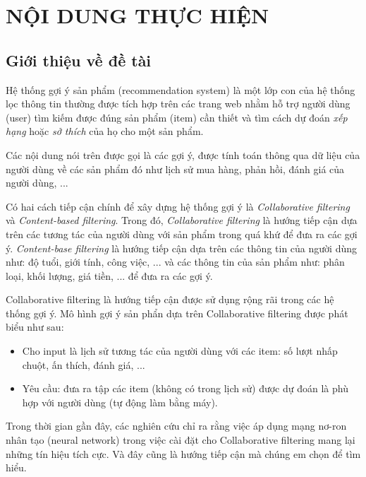 \documentclass{article}[14pt]
\begin{document}
    \section{NỘI DUNG THỰC HIỆN}
    {

    
    \subsection{Giới thiệu về đề tài}
    
    
        Hệ thống gợi ý sản phẩm (recommendation system) là một lớp con của hệ thống
    lọc thông tin thường được tích hợp trên các trang web nhằm hỗ trợ 
    người dùng (user) tìm kiếm được đúng sản phẩm (item) cần thiết  
    và tìm cách dự đoán \textit{xếp hạng} hoặc \textit{sở thích} 
    của họ cho một sản phẩm.
    
    Các nội dung nói trên được gọi là các gợi ý, được tính toán thông qua dữ liệu
    của người dùng về các sản phẩm đó như lịch sử mua hàng, phản hồi, đánh giá của
    người dùng, ...

    Có hai cách tiếp cận chính để xây dựng hệ thống gợi ý là 
    \textit{Collaborative filtering} và \textit{Content-based filtering}.
    Trong đó, \textit{Collaborative filtering} là hướng tiếp cận dựa trên các 
    tương tác của người dùng với sản phẩm trong quá khứ để đưa ra các gợi ý. 
    \textit{Content-base filtering} là hướng tiếp cận dựa trên các thông tin 
    của người dùng như: độ tuổi, giới tính, công việc, ... và các thông tin 
    của sản phẩm như: phân loại, khối lượng, giá tiền, ... để đưa ra các gợi ý.

    Collaborative filtering là hướng tiếp cận được sử dụng rộng rãi trong các 
    hệ thống gợi ý. 
    Mô hình gợi ý sản phẩn dựa trên Collaborative filtering được phát biểu như 
    sau:
    \begin{itemize}
        \item Cho input là lịch sử tương tác của người dùng với các item:
            số lượt nhấp chuột, ấn thích, đánh giá, ... 
        \item Yêu cầu: đưa ra tập các item (không có trong lịch sử) 
        được dự đoán là phù hợp với người dùng (tự động làm bằng máy).
    \end{itemize}

    Trong thời gian gần đây, các nghiên cứu chỉ ra rằng việc áp dụng mạng 
    nơ-ron nhân tạo (neural network) trong việc cài đặt cho Collaborative filtering 
    mang lại những tín hiệu tích cực. 
    Và đây cũng là hướng tiếp cận mà chúng em chọn để tìm hiểu.

}
\end{document}
